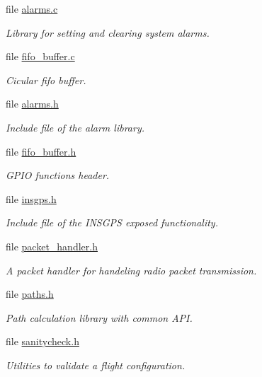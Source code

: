 \begin{DoxyCompactItemize}
\item 
file \hyperlink{alarms_8c}{alarms.\-c}
\begin{DoxyCompactList}\small\item\em \-Library for setting and clearing system alarms. \end{DoxyCompactList}\item 
file \hyperlink{fifo__buffer_8c}{fifo\-\_\-buffer.\-c}
\begin{DoxyCompactList}\small\item\em \-Cicular fifo buffer. \end{DoxyCompactList}\item 
file \hyperlink{alarms_8h}{alarms.\-h}
\begin{DoxyCompactList}\small\item\em \-Include file of the alarm library. \end{DoxyCompactList}\item 
file \hyperlink{fifo__buffer_8h}{fifo\-\_\-buffer.\-h}
\begin{DoxyCompactList}\small\item\em \-G\-P\-I\-O functions header. \end{DoxyCompactList}\item 
file \hyperlink{insgps_8h}{insgps.\-h}
\begin{DoxyCompactList}\small\item\em \-Include file of the \-I\-N\-S\-G\-P\-S exposed functionality. \end{DoxyCompactList}\item 
file \hyperlink{packet__handler_8h}{packet\-\_\-handler.\-h}
\begin{DoxyCompactList}\small\item\em \-A packet handler for handeling radio packet transmission. \end{DoxyCompactList}\item 
file \hyperlink{paths_8h}{paths.\-h}
\begin{DoxyCompactList}\small\item\em \-Path calculation library with common \-A\-P\-I. \end{DoxyCompactList}\item 
file \hyperlink{sanitycheck_8h}{sanitycheck.\-h}
\begin{DoxyCompactList}\small\item\em \-Utilities to validate a flight configuration. \end{DoxyCompactList}\item 

\end{DoxyCompactItemize}
